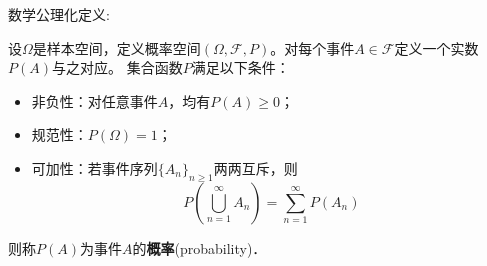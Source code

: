 数学公理化定义: 
\begin{definition}[概率的公理化定义]
    设$\Omega$是样本空间，定义概率空间$(\Omega,\mathcal{F},P)$。对每个事件$A\in \mathcal{F}$定义一个实数$P(A)$与之对应。
    集合函数$P$满足以下条件：
    \begin{itemize}
        \item 非负性：对任意事件$A$，均有$P(A)\ge 0$；
        \item 规范性：$P(\Omega)=1$；
        \item 可加性：若事件序列$\{A_n\}_{n\ge 1}$两两互斥，则
              $$P \left( \bigcup_{n=1}^{\infty} A_n \right)=\sum_{n=1}^{\infty} P(A_n)$$
    \end{itemize}
    则称$P(A)$为事件$A$的\textbf{概率}(probability)．
\end{definition}


